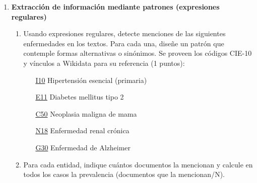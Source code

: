 \documentclass{article}
\begin{document}
\begin{enumerate}
  \item \textbf{Extracción de información mediante patrones (expresiones regulares)}
    \begin{enumerate}
        \item Usando expresiones regulares, detecte menciones de las siguientes enfermedades en los textos. Para cada una, diseñe un patrón que contemple formas alternativas o sinónimos. Se proveen los códigos CIE-10 y vínculos a Wikidata para su referencia (1 puntos):
          \begin{enumerate}
            \item[\href{https://www.wikidata.org/wiki/Q41861}{I10}] Hipertensión esencial (primaria)
            \item[\href{https://www.wikidata.org/wiki/Q3025883}{E11}] Diabetes mellitus tipo 2
            \item[\href{https://www.wikidata.org/wiki/Q128581}{C50}] Neoplasia maligna de mama
            \item[\href{https://www.wikidata.org/wiki/Q736715}{N18}] Enfermedad renal crónica
            \item[\href{https://www.wikidata.org/wiki/Q11081}{G30}] Enfermedad de Alzheimer
          \end{enumerate}
        \item Para cada entidad, indique cuántos documentos la mencionan y calcule en todos los casos la prevalencia (documentos que la mencionan/N).
    \end{enumerate}

\end{enumerate}
\end{document}
